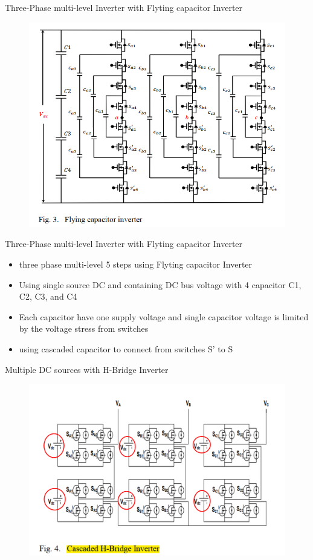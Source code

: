 \documentclass[
	11pt, %
]{beamer}
\begin{document}
\begin{frame}{Three-Phase multi-level Inverter with Flyting capacitor Inverter}
	\begin{figure}
		\includegraphics[width=0.6\linewidth]{flyingcap.png}
	\end{figure}
\end{frame}

\begin{frame}{Three-Phase multi-level Inverter with Flyting capacitor Inverter}
	\begin{itemize}
		\setlength{\itemsep}{10pt}
		\item {three phase multi-level 5 steps using Flyting capacitor Inverter}
		\item {Using single source DC and containing DC bus voltage with 4 capacitor C1, C2, C3, and C4}
		\item {Each capacitor have one supply voltage and single capacitor voltage is limited by the voltage stress from switches}
		\item {using cascaded capacitor to connect from switches S' to S}
	\end{itemize}
\end{frame}

\begin{frame}{Multiple DC sources with H-Bridge Inverter}
	\begin{figure}
		\includegraphics[width=0.7\linewidth]{cascade_Hbridge.png}
	\end{figure}
\end{frame}
\end{document}
